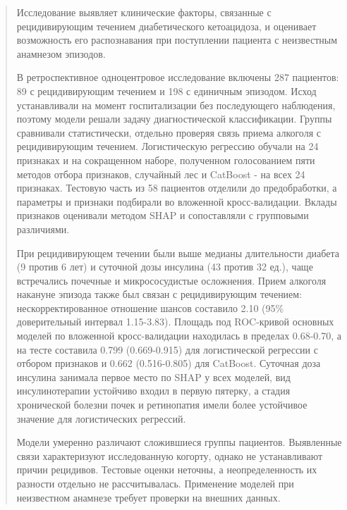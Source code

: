 \documentclass{crm-article}
\begin{document}
\begin{abstract}
Исследование выявляет клинические факторы, связанные с рецидивирующим течением диабетического кетоацидоза, и оценивает возможность его распознавания при поступлении пациента с неизвестным анамнезом эпизодов.

В ретроспективное одноцентровое исследование включены 287 пациентов: 89 с рецидивирующим течением и 198 с единичным эпизодом. Исход устанавливали на момент госпитализации без последующего наблюдения, поэтому модели решали задачу диагностической классификации. Группы сравнивали статистически, отдельно проверяя связь приема алкоголя с рецидивирующим течением. Логистическую регрессию обучали на 24 признаках и на сокращенном наборе, полученном голосованием пяти методов отбора признаков, случайный лес и CatBoost - на всех 24 признаках. Тестовую часть из 58 пациентов отделили до предобработки, а параметры и признаки подбирали во вложенной кросс-валидации. Вклады признаков оценивали методом SHAP и сопоставляли с групповыми различиями.

При рецидивирующем течении были выше медианы длительности диабета (9 против 6 лет) и суточной дозы инсулина (43 против 32 ед.), чаще встречались почечные и микрососудистые осложнения. Прием алкоголя накануне эпизода также был связан с рецидивирующим течением: нескорректированное отношение шансов составило 2.10 (95\% доверительный интервал 1.15-3.83). Площадь под ROC-кривой основных моделей по вложенной кросс-валидации находилась в пределах 0.68-0.70, а на тесте составила 0.799 (0.669-0.915) для логистической регрессии с отбором признаков и 0.662 (0.516-0.805) для CatBoost. Суточная доза инсулина занимала первое место по SHAP у всех моделей, вид инсулинотерапии устойчиво входил в первую пятерку, а стадия хронической болезни почек и ретинопатия имели более устойчивое значение для логистических регрессий.

Модели умеренно различают сложившиеся группы пациентов. Выявленные связи характеризуют исследованную когорту, однако не устанавливают причин рецидивов. Тестовые оценки неточны, а неопределенность их разности отдельно не рассчитывалась. Применение моделей при неизвестном анамнезе требует проверки на внешних данных.
\end{abstract}
\end{document}
